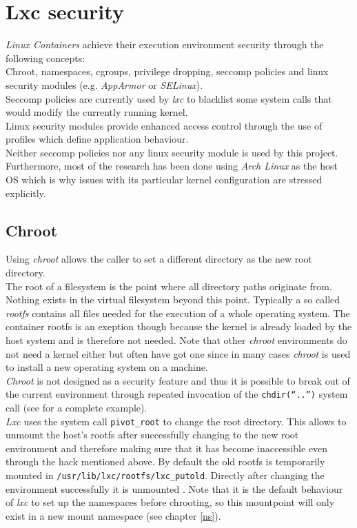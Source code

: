 \chapter{Lxc security}\label{features}

\textit{Linux Containers} achieve their execution environment security through the following concepts:\\
Chroot, namespaces, cgroups, privilege dropping, seccomp policies \cite{seccomp} and linux security modules
(e.g. \textit{AppArmor}\cite{apparmor} or \textit{SELinux}\cite{selinux}).\\
Seccomp policies are currently used by \textit{lxc} to blacklist some system calls that would modify the currently running kernel.\\
Linux security modules \cite{lsm} provide enhanced access control through the use of profiles which define application behaviour.\\
Neither seccomp policies nor any linux security module is used by this project.\\
Furthermore, most of the research has been done using \textit{Arch Linux} as the host OS which is why issues with its particular
kernel configuration are stressed explicitly.

\section{Chroot}\label{rootfs}

Using \textit{chroot} allows the caller to set a different directory as the new root directory.\\
The root of a filesystem is the point where all directory paths originate from.
Nothing exists in the virtual filesystem beyond this point. Typically a so called \textit{rootfs} contains all files needed for
the execution of a whole operating system.
The container rootfs is an exeption though because the kernel is already loaded by
the host system and is therefore not needed. Note that other \textit{chroot} environments do not need a kernel either but often have got one
since in many cases \textit{chroot} is used to install a new operating system on a machine.\\
\textit{Chroot} is not designed as a security feature and thus it is possible to break out of the current environment through
repeated invocation of the \texttt{chdir(``..'')} system call (see \cite{chrootbreak} for a complete example).\\
\textit{Lxc} uses the system call \texttt{pivot\_root} to change the root directory. This allows to unmount the host's rootfs after
successfully changing to the new root environment and therefore making sure that it has become inaccessible even through the hack
mentioned above.
By default the old rootfs is temporarily mounted in \texttt{/usr/lib/lxc/rootfs/lxc\_putold}. Directly after changing the environment successfully
it is unmounted \cite{pivotsetup}. Note that it is the default behaviour of \textit{lxc} to set up the namespaces before chrooting, so this
mountpoint will only exist in a new mount namespace (see chapter \ref{ns}).

